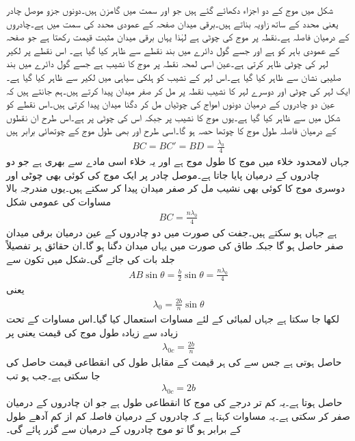 شکل  میں  موج کے دو  اجزاء دکھائے گئے ہیں جو  اور  سمت میں گامزن ہیں۔دونوں جزو موصل چادر یعنی  محدد کے ساتھ  زاویہ بناتے ہیں۔برقی میدان صفحہ کے عمودی  محدد کی سمت میں ہے۔چادروں کے درمیان فاصلہ  ہے۔نقطہ  پر موج  کی چوٹی ہے لہٰذا یہاں برقی میدان  مثبت  قیمت رکھتا ہے جو صفحہ کے عمودی باہر کو ہے اور جسے گول دائرے میں بند نقطے سے ظاہر کیا گیا ہے۔ اس نقطے پر لکیر  لہر کی چوٹی ظاہر کرتی ہے۔عین اسی لمحہ نقطہ  پر موج  کا نشیب ہے جسے گول دائرے میں بند صلیبی نشان سے ظاہر کیا گیا ہے۔اس لہر کے نشیب کو ہلکی سیاہی میں لکیر  سے ظاہر کیا گیا ہے۔ایک لہر کی چوٹی اور دوسرے لہر کا نشیب نقطہ  پر مل کر صفر میدان پیدا کرتے ہیں۔ہم جانتے ہیں کہ عین دو چادروں کے درمیان دونوں امواج کی چوٹیاں مل کر دگنا میدان پیدا کرتی ہیں۔اس نقطے کو شکل میں  سے ظاہر کیا گیا ہے۔یوں موج  کا نشیب  پر جبکہ اس کی چوٹی  پر ہے۔اس طرح ان نقطوں کے درمیان فاصلہ طول موج کا چوتھا حصہ ہو گا۔اسی طرح  اور  بھی طول موج کے چوتھائی برابر  ہیں
\begin{align}
BC=BC'=BD=\frac{\lambda_0}{4}
\end{align}
جہاں لامحدود خلاء میں  موج کا طول موج  ہے اور یہ خلاء اسی مادے سے بھری ہے جو دو چادروں کے درمیان پایا جاتا ہے۔موصل چادر پر ایک موج کی کوئی بھی چوٹی اور دوسری موج کا کوئی بھی نشیب مل کر صفر میدان پیدا کر سکتے ہیں۔یوں مندرجہ بالا مساوات کی عمومی شکل
\begin{align}\label{مساوات_مویج_چوٹی_نشیب_ختم_عمومی}
BC=\frac{n \lambda_0}{4}
\end{align}
ہے جہاں  ہو سکتے ہیں۔جفت  کی صورت میں دو چادروں کے عین درمیان برقی میدان صفر حاصل ہو گا جبکہ طاق  کی صورت میں یہاں میدان دگنا ہو گا۔ان حقائق ہر تفصیلاً جلد بات کی جائے گی۔شکل  میں تکون  سے
\begin{align*}
AB \sin \theta = \frac{b}{2}\sin \theta =\frac{n \lambda_0}{4}
\end{align*}
یعنی
\begin{align}\label{مساوات_مویج_طول_اور_درجہ_انداز}
\lambda_0 = \frac{2b}{n} \sin \theta
\end{align}
لکھا جا سکتا ہے جہاں لمبائی  کے لئے مساوات  استعمال کیا گیا۔اس مساوات کے تحت زیادہ سے زیادہ طول موج  کی قیمت  یعنی  پر
\begin{align}\label{مساوات_مویج_طول_موج_بالمقابل_درجہ_موج}
\lambda_{0c}=\frac{2b}{n}
\end{align}
 حاصل ہوتی ہے جس سے  کی ہر قیمت کے مقابل طول کی انقطاعی قیمت حاصل کی جا سکتی ہے۔جب  ہو تب
 \begin{align}\label{مساوات_مویج_دو_چادر_انقطاعی_طول_موج}
\lambda_{0c}=2b
\end{align}
حاصل ہوتا ہے۔یہ کم تر درجے کی  موج کا انقطاعی طول ہے جو ان چادروں کے درمیان صفر کر سکتی ہے۔یہ مساوات کہتا ہے کہ چادروں کے درمیان فاصلہ کم از کم آدھے طول کے برابر ہو گا تو موج چادروں کے درمیان سے گزر پائے گی۔

